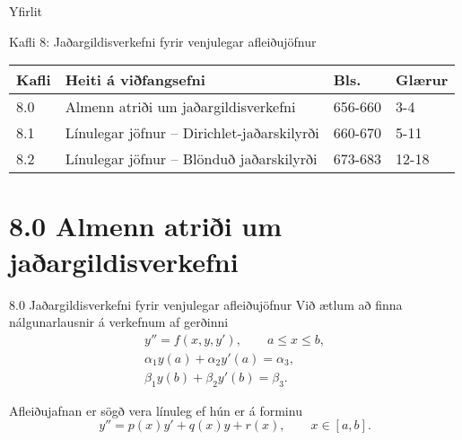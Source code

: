 \date{26.~og 28.~mars, 2014}



\begin{frame}
	\maketitle
\end{frame}

\begin{frame}{Yfirlit}
\begin{block}{Kafli 8: Jaðargildisverkefni fyrir 
  venjulegar afleiðujöfnur}
\begin{center}
\begin{tabular}{|l|l|l|l|}\hline
Kafli &Heiti á viðfangsefni &Bls. & Glærur\\
\hline
8.0 &Almenn atriði um jaðargildisverkefni & 656-660 & 3-4\\
8.1 & Línulegar jöfnur -- Dirichlet-jaðarskilyrði & 660-670 & 5-11\\
8.2 & Línulegar jöfnur -- Blönduð jaðarskilyrði & 673-683 & 12-18 \\
\hline
\end{tabular}
\end{center}
\end{block}
\end{frame}

\section*{8.0 Almenn atriði um jaðargildisverkefni}
\begin{frame}{8.0  Jaðargildisverkefni fyrir venjulegar afleiðujöfnur} 
Við ætlum að finna nálgunarlausnir á verkefnum af gerðinni
  \begin{gather*}
    y''=f(x,y,y'), \qquad a\leq x\leq b,\\
\alpha_1y(a)+\alpha_2 y'(a)=\alpha_3,\\
\beta_1 y(b)+\beta_2y'(b)=\beta_3.  
  \end{gather*}

\pause
Afleiðujafnan er sögð vera línuleg ef hún er á forminu
$$
y''=p(x)y'+q(x)y+r(x), \qquad x\in [a,b].
$$
\end{frame}

